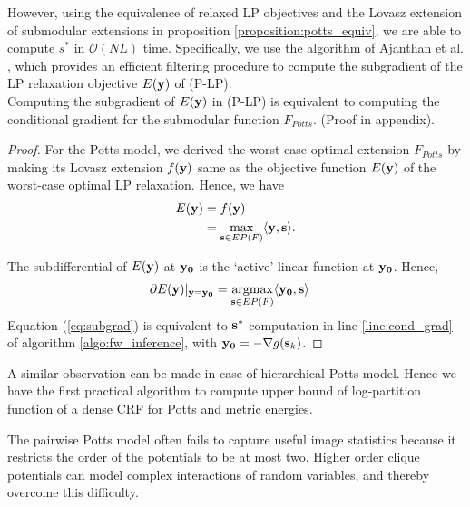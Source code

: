 However, using the equivalence of relaxed LP objectives and the Lovasz
extension of submodular extensions in proposition
\ref{proposition:potts_equiv}, we are able to compute $s^*$ in ${\mathcal
O}(NL)$ time. Specifically, we use the algorithm of
Ajanthan et al. \citep{ajanthan2017efficient}, which provides an efficient filtering procedure to compute the subgradient of the LP relaxation objective $E({\bf y})$ of (P-LP).\\
%
\vspace{-0.5cm}
{\proposition Computing the subgradient of $E({\bf y})$ in (P-LP) is equivalent to computing the conditional gradient for the submodular function $F_{Potts}$. \label{proposition:subgrad}} 
\newline(Proof in appendix).
\begin{proof}
  For the Potts model, we derived the worst-case optimal extension $F_{Potts}$ by
  making its Lovasz extension $f({\bf y})$ same as the objective function
    $E({\bf y})$ of the worst-case optimal LP relaxation. Hence, we have
\begin{align}
    E({\bf y}) &= f({\bf y})  \nonumber \\
    {} &=  \max_{{\bf s} \in EP(F)} \langle {\bf y}, {\bf s} \rangle.\nonumber
\end{align}

The subdifferential of $E({\bf y})$ at $\bf y_0$ is the `active' linear function at $\bf y_0$. Hence,
\begin{align}
    \partial E({\bf y})|_{\bf y = y_0} &=  \argmax_{{\bf s} \in EP(F)} \langle {\bf y_0}, {\bf s} \rangle
    \label{eq:subgrad}
\end{align}
Equation (\ref{eq:subgrad}) is equivalent to ${\bf s}^*$ computation in line \ref{line:cond_grad} of algorithm \ref{algo:fw_inference}, with ${\bf y_0} = - \nabla g({\bf s}_k)$.
\end{proof}

A similar observation can be made in case of hierarchical Potts model. Hence we have the first practical algorithm to compute upper bound of log-partition function of a dense CRF for Potts and metric energies.

 The pairwise Potts model often fails
to capture useful image statistics because it restricts the order of the
potentials to be at most two. Higher order clique potentials can model complex
interactions of random variables, and thereby overcome this difficulty.


